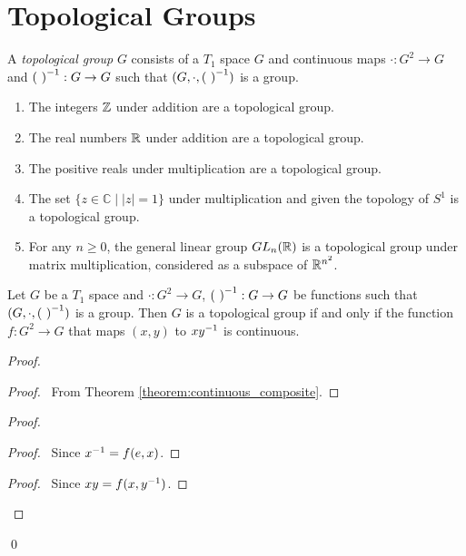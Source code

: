 \section{Topological Groups}

\begin{definition}
    A \emph{topological group} $G$ consists of a $T_1$ space $G$ and continuous maps
    $\cdot : G^2 \rightarrow G$ and ${(\ )}^{-1} : G \rightarrow G$ such that $(G, \cdot, \inv{(\ )})$
    is a group.
\end{definition}

\begin{example}
    \begin{enumerate}
        \item The integers $\mathbb{Z}$ under addition are a topological group.
        \item The real numbers $\mathbb{R}$ under addition are a topological group.
        \item The positive reals under multiplication are a topological group.
        \item The set $\{ z \in \mathbb{C} \mid |z| = 1 \}$ under multiplication
        and given the topology of $S^1$ is a topological group.
        \item For any $n \geq 0$, the general linear group $GL_n(\mathbb{R})$ is a topological
        group under matrix multiplication, considered as a subspace of $\mathbb{R}^{n^2}$.
    \end{enumerate}
\end{example}

\begin{lemma}
    Let $G$ be a $T_1$ space and $\cdot : G^2 \rightarrow G$, ${(\ )}^{-1} : G \rightarrow G$
    be functions such that $(G, \cdot, \inv{(\ )})$ is a group. Then $G$ is a
    topological group if and only if the function $f : G^2 \rightarrow G$ that maps
    $(x,y)$ to $x {y}^{-1}$ is continuous.
\end{lemma}

\begin{proof}
    \pf
    \begin{proof}
        \pf\ From Theorem \ref{theorem:continuous_composite}.
    \end{proof}
    \begin{proof}
        \begin{proof}
            \pf\ Since ${x}^{-1} = f(e,x)$.
        \end{proof}
        \begin{proof}
            \pf\ Since $xy = f(x,{y}^{-1})$.
        \end{proof}
    \end{proof}
    \qed
\end{proof}

